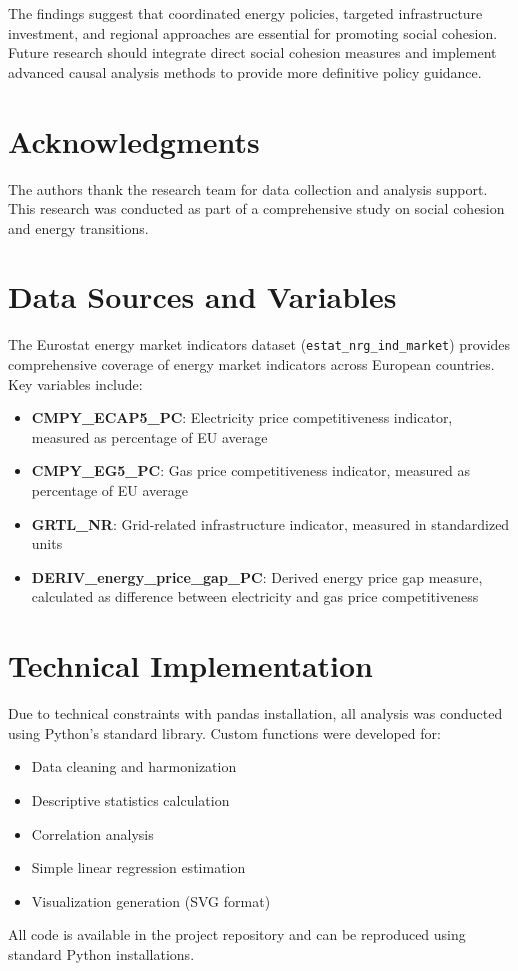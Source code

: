 \documentclass[11pt,a4paper]{article}
\begin{document}
The findings suggest that coordinated energy policies, targeted infrastructure investment, and regional approaches are essential for promoting social cohesion. Future research should integrate direct social cohesion measures and implement advanced causal analysis methods to provide more definitive policy guidance.

\section*{Acknowledgments}

The authors thank the research team for data collection and analysis support. This research was conducted as part of a comprehensive study on social cohesion and energy transitions.




\appendix

\section{Data Sources and Variables}
\label{app:data}

The Eurostat energy market indicators dataset (\texttt{estat\_nrg\_ind\_market}) provides comprehensive coverage of energy market indicators across European countries. Key variables include:

\begin{itemize}
\item \textbf{CMPY\_ECAP5\_PC}: Electricity price competitiveness indicator, measured as percentage of EU average
\item \textbf{CMPY\_EG5\_PC}: Gas price competitiveness indicator, measured as percentage of EU average
\item \textbf{GRTL\_NR}: Grid-related infrastructure indicator, measured in standardized units
\item \textbf{DERIV\_energy\_price\_gap\_PC}: Derived energy price gap measure, calculated as difference between electricity and gas price competitiveness
\end{itemize}

\section{Technical Implementation}
\label{app:technical}

Due to technical constraints with pandas installation, all analysis was conducted using Python's standard library. Custom functions were developed for:

\begin{itemize}
\item Data cleaning and harmonization
\item Descriptive statistics calculation
\item Correlation analysis
\item Simple linear regression estimation
\item Visualization generation (SVG format)
\end{itemize}

All code is available in the project repository and can be reproduced using standard Python installations.
\end{document}
